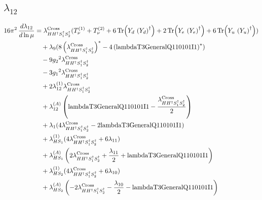 \documentclass[10pt,a4paper]{article}
\begin{document}
\subsection*{$\lambda_{12}$}
\begin{align*}
16\pi^2\,\frac{d \lambda_{12}}{d\ln\mu} &={\lambda_{H H^\dagger S_1^\dagger S_2^\dagger}^{\rm Cross}} (T_{\nu}^{(1)}+T_{\nu}^{(2)}+6 \operatorname{Tr}\!\left({Y_d}\,\left({Y_d}\right)^{\dagger}\right)+2 \operatorname{Tr}\!\left({Y_e}\,\left({Y_e}\right)^{\dagger}\right)+6 \operatorname{Tr}\!\left({Y_u}\,\left({Y_u}\right)^{\dagger}\right)) \\
&\quad +{\lambda_{9}} (8 \left({\lambda_{H H^\dagger S_1^\dagger S_2^\dagger}^{\rm Cross}}\right)^{*}-4 \left(\text{lambdaT3GeneralQ110101I1}\right)^{*}) \\
&\quad -9 {g_2}^2 {\lambda_{H H^\dagger S_1^\dagger S_2^\dagger}^{\rm Cross}} \\
&\quad -3 {g_1}^2 {\lambda_{H H^\dagger S_1^\dagger S_2^\dagger}^{\rm Cross}} \\
&\quad +2 {\lambda_{12}^{(1)}} {\lambda_{H H^\dagger S_1^\dagger S_2^\dagger}^{\rm Cross}} \\
&\quad +{\lambda_{12}^{(A)}} \left(\text{lambdaT3GeneralQ110101I1}-\frac{{\lambda_{H H^\dagger S_1^\dagger S_2^\dagger}^{\rm Cross}}}{2}\right) \\
&\quad +{\lambda_1} (4 {\lambda_{H H^\dagger S_1^\dagger S_2^\dagger}^{\rm Cross}}-2 \text{lambdaT3GeneralQ110101I1}) \\
&\quad +{\lambda_{HS_1}^{(1)}} (4 {\lambda_{H H^\dagger S_1^\dagger S_2^\dagger}^{\rm Cross}}+6 {\lambda_{11}}) \\
&\quad +{\lambda_{HS_1}^{(A)}} \left(2 {\lambda_{H H^\dagger S_1^\dagger S_2^\dagger}^{\rm Cross}}+\frac{{\lambda_{11}}}{2}+\text{lambdaT3GeneralQ110101I1}\right) \\
&\quad +{\lambda_{HS_2}^{(1)}} (4 {\lambda_{H H^\dagger S_1^\dagger S_2^\dagger}^{\rm Cross}}+6 {\lambda_{10}}) \\
&\quad +{\lambda_{HS_2}^{(A)}} \left(-2 {\lambda_{H H^\dagger S_1^\dagger S_2^\dagger}^{\rm Cross}}-\frac{{\lambda_{10}}}{2}-\text{lambdaT3GeneralQ110101I1}\right) \\
\end{align*}
\end{document}
